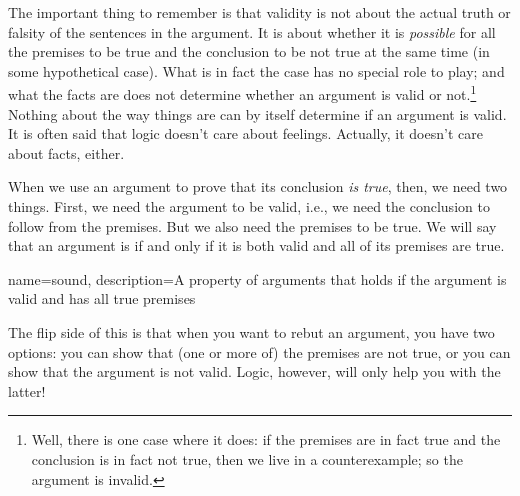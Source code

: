 The important thing to remember is that validity is not about the actual truth or falsity of the sentences in the argument. It is about whether it is \emph{possible} for all the premises to be true and the conclusion to be not true at the same time (in some hypothetical case). What is in fact the case has no special role to play; and what the facts are does not determine whether an argument is valid or not.\footnote{Well, there is one case where it does: if the premises are in fact true and the conclusion is in fact not true, then we live in a counterexample; so the argument is invalid.} Nothing about the way things are can by itself determine if an argument is valid. It is often said that logic doesn't care about feelings. Actually, it doesn't care about facts, either.

When we use an argument to prove that its conclusion \emph{is true}, then, we need two things. First, we need the argument to be valid, i.e., we need the conclusion to follow from the premises. But we also need the premises to be true. We will say that an argument is  if and only if it is both valid and all of its premises are true.

{
name=sound,
description={A property of arguments that holds if the argument is valid and has all true premises}
}

The flip side of this is that when you want to rebut an argument, you have two options: you can show that (one or more of) the premises are not true, or you can show that the argument is not valid.  Logic, however, will only help you with the latter!

